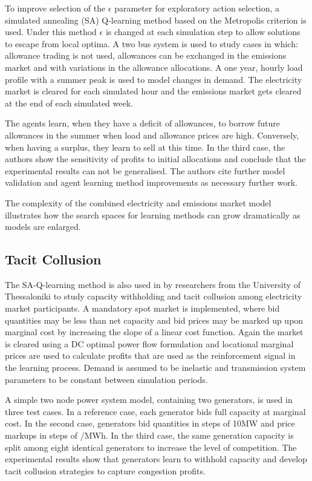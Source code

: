 To improve selection of the $\epsilon$ parameter for exploratory action
selection, a simulated annealing (SA) Q-learning method based on the Metropolis
criterion \cite{guo:sa} is used.  Under this method $\epsilon$ is changed at
each simulation step to allow solutions to escape from local optima.  A two bus
system is used to study cases in which: allowance trading is not used,
allowances can be exchanged in the emissions market and with variations in the
allowance allocations.  A one year, hourly load profile with a summer peak is
used to model changes in demand.  The electricity market is cleared for each
simulated hour and the emissions market gets cleared at the end of each
simulated week.

The agents learn, when they have a deficit of allowances, to borrow future
allowances in the summer when load and allowance prices are high.  Conversely,
when having a surplus, they learn to sell at this time.  In the third case, the
authors show the sensitivity of profits to initial allocations and conclude that
the experimental results can not be generalised.  The authors cite further model
validation and agent learning method improvements as necessary further work.

The complexity of the combined electricity and emissions market model
illustrates how the search spaces for learning methods can grow dramatically
as models are enlarged.

\subsection{Tacit Collusion}
The SA-Q-learning method is also used in  by
researchers from the University of Thessaloniki to study capacity withholding
and tacit collusion among electricity market participants.  A mandatory spot
market is implemented, where bid quantities may be less than net capacity and
bid prices may be marked up upon marginal cost by increasing the slope of a
linear cost function.  Again the market is cleared using a DC optimal power flow
formulation and locational marginal prices are used to calculate profits that
are used as the reinforcement signal in the learning process.  Demand is assumed
to be inelastic and transmission system parameters to be constant between
simulation periods.

A simple two node power system model, containing two generators, is used in
three test cases. In a reference case, each generator bids full capacity at
marginal cost.  In the second case, generators bid quantities in steps of 10MW
and price markups in steps of /MWh.  In the third case, the same
generation capacity is split among eight identical generators to increase the
level of competition. The experimental results show that generators learn to
withhold capacity and develop tacit collusion strategies to capture
congestion profits.

